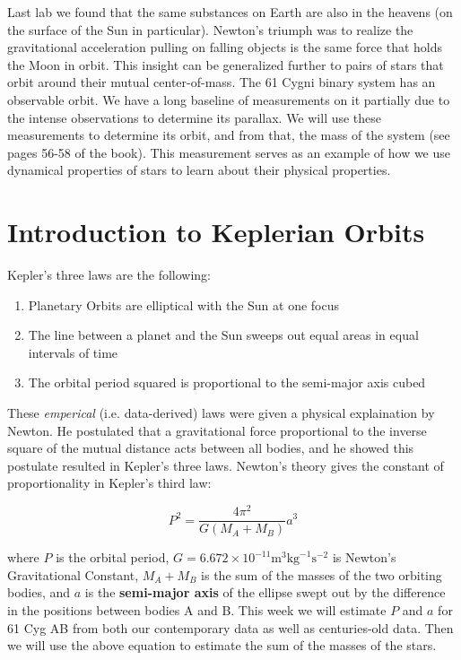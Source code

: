 Last lab we found that the same substances on Earth are also in the heavens (on the surface of the Sun in particular).  Newton’s triumph was to realize the gravitational acceleration pulling on falling objects is the same force that holds the Moon in orbit.  This insight can be generalized further to pairs of stars that orbit around their mutual center-of-mass.  The 61 Cygni binary system has an observable orbit. We have a long baseline of measurements on it partially due to the intense observations to determine its parallax.  We will use these measurements to determine its orbit, and from that, the mass of the system (see pages 56-58 of the book). This measurement serves as an example of how we use dynamical properties of stars to learn about their physical properties. 

\section{Introduction to Keplerian Orbits}
 
Kepler's three laws are the following:

\begin{enumerate}
\item Planetary Orbits are elliptical with the Sun at one focus
\item The line between a planet and the Sun sweeps out equal areas in equal intervals of time
\item The orbital period squared is proportional to the semi-major axis cubed
\end{enumerate}

These \textit{emperical} (i.e. data-derived) laws were given a physical explaination by Newton. He postulated that a gravitational force proportional to the inverse square of the mutual distance acts between all bodies, and he showed this postulate resulted in Kepler’s three laws. Newton's theory gives the constant of proportionality in Kepler's third law:

\begin{equation}
P^2 = \frac{4\pi^2}{G(M_A + M_B)}a^3
\end{equation}

where $P$ is the orbital period, $G = 6.672 \times 10^{-11} \textrm{m}^3\textrm{kg}^{-1}\textrm{s}^{-2}$ is Newton's Gravitational Constant, $M_A + M_B$ is the sum of the masses of the two orbiting bodies, and $a$ is the \textbf{semi-major axis} of the ellipse swept out by the difference in the positions between bodies A and B. This week we will estimate $P$ and $a$ for 61 Cyg AB from both our contemporary data as well as centuries-old data. Then we will use the above equation to estimate the sum of the masses of the stars. 

